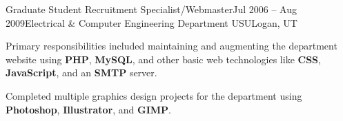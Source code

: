 
\def\PositionTitle{Graduate Student Recruitment Specialist/Webmaster}
\def\PositionPeriod{Jul 2006 -- Aug 2009} %
\def\OrgName{Electrical \& Computer Engineering Department USU}
\def\OrgLocation{Logan, UT}


\begin{rExperience}{\PositionTitle}{\PositionPeriod}{\OrgName}{\OrgLocation}

  \item Primary responsibilities included maintaining and augmenting the department website using \textbf{PHP}, \textbf{MySQL}, and other basic web technologies like \textbf{CSS}, \textbf{JavaScript}, and an \textbf{SMTP} server.

  \item Completed multiple graphics design projects for the department using \textbf{Photoshop}, \textbf{Illustrator}, and \textbf{GIMP}.

%
%
%
%

\end{rExperience}
